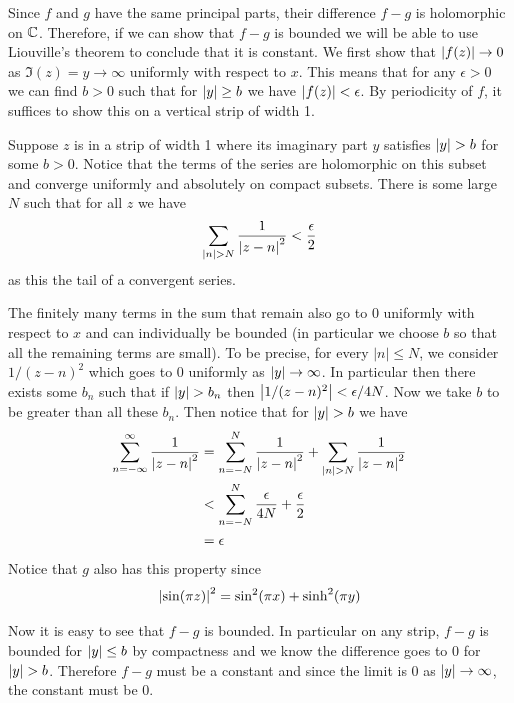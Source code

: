 Since $f$ and $g$ have the same principal parts, their difference $f - g$ is holomorphic on $\mathbb{C}$. Therefore, if we can show that $f - g$ is bounded we will be able to use Liouville's theorem to conclude that it is constant. We first show that $\left|f(z)\right| \to 0$ as $\Im(z) = y \to \infty$ uniformly with respect to $x$. This means that for any $\epsilon > 0$ we can find $b > 0$ such that for $\left|y\right| \geq b$ we have $\left|f(z)\right| < \epsilon$. By periodicity of $f$, it suffices to show this on a vertical strip of width 1.

Suppose $z$ is in a strip of width 1 where its imaginary part $y$ satisfies $\left|y\right| > b$ for some $b > 0$. Notice that the terms of the series are holomorphic on this subset and converge uniformly and absolutely on compact subsets. 
There is some large $N$ such that for all $z$ we have
$$\sum_{\left|n\right| > N} \frac{1}{\left|z - n\right|^2} < \frac{\epsilon}{2}$$
as this the tail of a convergent series. 

The finitely many terms in the sum that remain also go to 0 uniformly with respect to $x$ and can individually be bounded (in particular we choose $b$ so that all the remaining terms are small). To be precise, for every $|n| \leq N$, we consider $1/(z - n)^2$ which goes to 0 uniformly as $\left|y\right| \to \infty$. In particular then there exists some $b_n$ such that if $\left|y\right| > b_n$ then $\left|1/(z - n)^2\right| < \epsilon/4N$. Now we take $b$ to be greater than all these $b_n$. Then notice that for $\left|y\right| > b$ we have 
\begin{align*}
    \sum_{n = -\infty}^{\infty} \frac{1}{\left|z - n\right|^2} &= \sum_{n = -N}^N \frac{1}{\left|z - n\right|^2} + \sum_{\left|n\right| > N} \frac{1}{\left|z - n\right|^2}\\
    &< \sum_{n = -N}^N \frac{\epsilon}{4N} + \frac{\epsilon}{2}\\
    &= \epsilon
\end{align*} 
Notice that $g$ also has this property since 
$$\left|\sin(\pi z)\right|^2 = \sin^2 (\pi x) + \sinh^2 (\pi y)$$

Now it is easy to see that $f - g$ is bounded. In particular on any strip, $f - g$ is bounded for $\left|y\right| \leq b$ by compactness and we know the difference goes to 0 for $\left|y\right| > b$. Therefore $f - g$ must be a constant and since the limit is 0 as $\left|y\right| \to \infty$, the constant must be 0.

